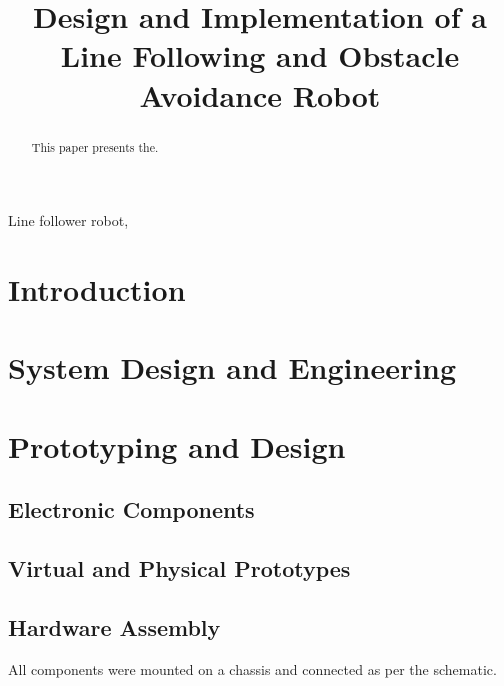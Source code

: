 \documentclass[conference]{IEEEtran}
\begin{document}
\title{Design and Implementation of a Line Following and Obstacle Avoidance Robot}

\author{
}

\maketitle

\begin{abstract}
This paper presents the.
\end{abstract}

\begin{IEEEkeywords}
Line follower robot,
\end{IEEEkeywords}

\section{Introduction}

\section{System Design and Engineering}

\section{Prototyping and Design}

\subsection{Electronic Components}

\subsection{Virtual and Physical Prototypes}


\subsection{Hardware Assembly}
All components were mounted on a chassis and connected as per the schematic.
\end{document}
